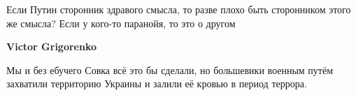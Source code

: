 \begin{itemize}
\begin{itemize}
Если Путин сторонник здравого смысла, то разве плохо быть сторонником этого же
смысла? Если у кого-то паранойя, то это о другом


 
\textbf{Victor Grigorenko} 

Мы и без ебучего Совка всё это бы сделали, но большевики военным путём
захватили территорию Украины и залили её кровью в период террора.

\end{itemize}

\end{itemize}


